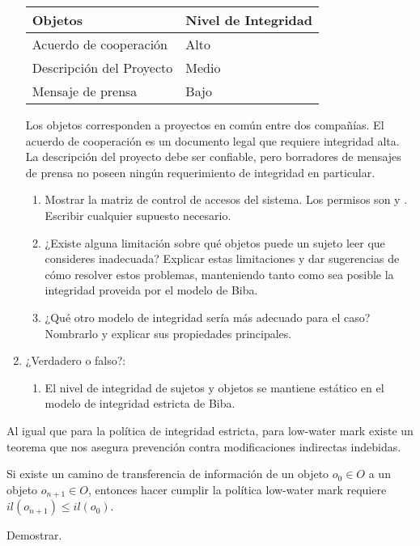 \begin{enumerate}
\begin{table}[h!]
  \centering
\begin{tabular}{l|l} 
Objetos & Nivel de Integridad \\ 
 \hline
Acuerdo de cooperación   & Alto\\ 
Descripción del Proyecto & Medio\\ 
Mensaje de prensa        & Bajo\\
\end{tabular}
\end{table}

Los objetos corresponden a proyectos en común entre dos compañías. El acuerdo de
cooperación es un documento legal que requiere integridad alta. La descripción
del proyecto debe ser confiable, pero borradores de mensajes de prensa no poseen
ningún requerimiento de integridad en particular.

\begin{enumerate}
  \item Mostrar la matriz de control de accesos del sistema. Los permisos son
     y . Escribir cualquier
    supuesto necesario.

\item ¿Existe alguna limitación sobre qué objetos puede un sujeto leer que
consideres inadecuada? Explicar estas limitaciones y dar sugerencias de cómo
resolver estos problemas, manteniendo tanto como sea posible la integridad
proveida por el modelo de Biba.

\item ¿Qué otro modelo de integridad sería más adecuado para el caso? Nombrarlo y
explicar sus propiedades principales.
\end{enumerate}
\item ¿Verdadero o falso?:

\begin{enumerate}
  \item El nivel de integridad de sujetos y objetos se mantiene estático en el
    modelo de integridad estricta de Biba.
\end{enumerate}
\end{enumerate}

\item Al igual que para la política de integridad estricta, para low-water mark
  existe un teorema que nos asegura prevención contra modificaciones indirectas
  indebidas.
  
  \begin{thm}
    Si existe un camino de transferencia de información de un objeto $o_0 \in O$
    a un objeto $o_{n+1} \in O$, entonces hacer cumplir la política low-water
    mark requiere $il(o_{n+1}) \leq il(o_0)$.
  \end{thm}
  Demostrar.

